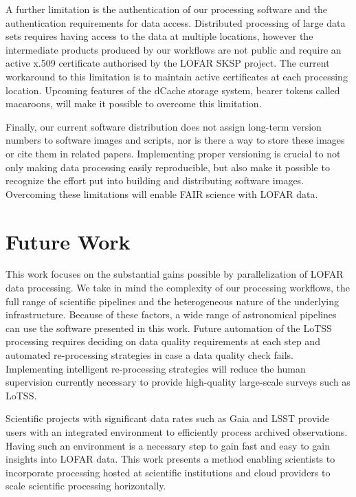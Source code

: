 A further limitation is the authentication of our processing software and the authentication requirements for data access. Distributed processing of large data sets requires having access to the data at multiple locations, however the intermediate products produced by our workflows are not public and require an active x.509 certificate authorised by the LOFAR SKSP project. The current workaround to this limitation is to maintain active certificates at each processing location. Upcoming features of the \gls{dCache} storage system, bearer tokens called macaroons, will make it possible to overcome this limitation.

Finally, our current software distribution does not assign long-term version numbers to software images and scripts, nor is there a way to store these images or cite them in related papers. Implementing proper versioning is crucial to not only making data processing easily reproducible, but also make it possible to recognize the effort put into building and distributing software images. Overcoming these limitations will enable FAIR science with LOFAR data\citep{wilkinson2016fair}.


\section{Future Work}

This work focuses on the substantial gains possible by parallelization of LOFAR data processing. We take in mind the complexity of our processing workflows, the full range of scientific pipelines and the heterogeneous nature of the underlying infrastructure. Because of these factors, a wide range of astronomical pipelines can use the software presented in this work. Future automation of the LoTSS processing requires deciding on data quality requirements at each step and automated re-processing strategies in case a data quality check fails. Implementing intelligent re-processing strategies will reduce the human supervision currently necessary to provide high-quality large-scale surveys such as LoTSS. 

Scientific projects with significant data rates such as Gaia and LSST provide users with an integrated environment to efficiently process archived observations. Having such an environment is a necessary step to gain fast and easy to gain insights into LOFAR data. This work presents a method enabling scientists to incorporate processing hosted at scientific institutions and cloud providers to scale scientific processing horizontally. 

